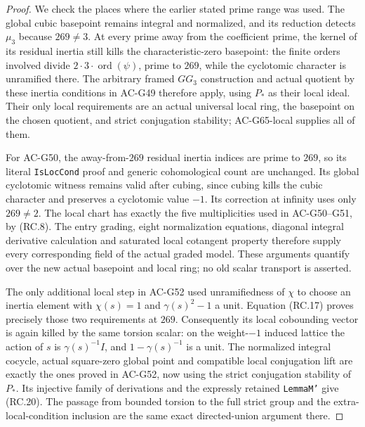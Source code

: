 \begin{proof}
We check the places where the earlier stated prime
range was used.
The global cubic basepoint remains integral and
normalized, and its reduction detects \(\mu_3\)
because \(269\ne3\).
At every prime away from the coefficient prime,
the kernel of its residual inertia still kills
the characteristic-zero basepoint: the finite
orders involved divide
\(2\cdot3\cdot\operatorname{ord}(\psi)\), prime
to \(269\), while the cyclotomic character is
unramified there.  The arbitrary framed
\(GG_3\) construction and actual quotient by
these inertia conditions in AC-G49 therefore
apply, using \(P_*\) as their local ideal.
Their only local requirements are an actual
universal local ring, the basepoint on the
chosen quotient, and strict conjugation
stability; AC-G65-local supplies all of them.

For AC-G50, the away-from-\(269\) residual
inertia indices are prime to \(269\), so its
literal \texttt{IsLocCond} proof and generic
cohomological count are unchanged.
Its global cyclotomic witness remains valid
after cubing, since cubing kills the cubic
character and preserves a cyclotomic value
\(-1\).  Its correction at infinity uses only
\(269\ne2\).
The local chart has exactly the five
multiplicities used in AC-G50--G51, by (RC.8).
The entry grading, eight normalization
equations, diagonal integral derivative
calculation and saturated local cotangent
property therefore supply every corresponding
field of the actual graded model.  These
arguments quantify over the new actual
basepoint and local ring; no old scalar
transport is asserted.

The only additional local step in AC-G52
used unramifiedness of \(\chi\) to choose
an inertia element with \(\chi(s)=1\) and
\(\gamma(s)^2-1\) a unit.
Equation (RC.17) proves precisely those
two requirements at \(269\).
Consequently its local cobounding vector
is again killed by the same torsion scalar:
on the weight-\(-1\) induced lattice the
action of \(s\) is \(\gamma(s)^{-1}I\),
and \(1-\gamma(s)^{-1}\) is a unit.
The normalized integral cocycle, actual
square-zero global point and compatible
local conjugation lift are exactly the
ones proved in AC-G52, now using the
strict conjugation stability of \(P_*\).
Its injective family of derivations and
the expressly retained \texttt{LemmaM'}
give (RC.20).  The passage from bounded
torsion to the full strict group and the
extra-local-condition inclusion are the
same exact directed-union argument there.
\end{proof}


